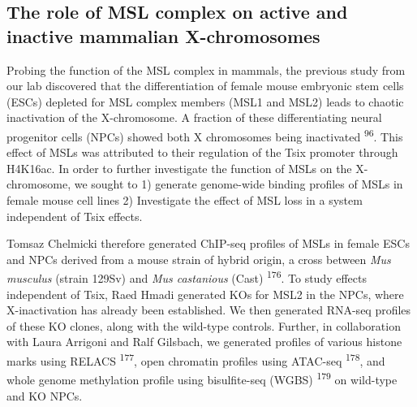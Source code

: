 \documentclass[11pt,twoside]{MPIthesis}
\theoremstyle{definition}
\theoremstyle{definition}
\theoremstyle{definition}
\theoremstyle{remark}
\begin{document}
\subsection{The role of MSL complex on active and inactive mammalian
X-chromosomes}\label{the-role-of-msl-complex-on-active-and-inactive-mammalian-x-chromosomes}

Probing the function of the MSL complex in mammals, the previous study
from our lab discovered that the differentiation of female mouse
embryonic stem cells (ESCs) depleted for MSL complex members (MSL1 and
MSL2) leads to chaotic inactivation of the X-chromosome. A fraction of
these differentiating neural progenitor cells (NPCs) showed both X
chromosomes being inactivated \textsuperscript{96}. This effect of MSLs
was attributed to their regulation of the Tsix promoter through H4K16ac.
In order to further investigate the function of MSLs on the
X-chromosome, we sought to 1) generate genome-wide binding profiles of
MSLs in female mouse cell lines 2) Investigate the effect of MSL loss in
a system independent of Tsix effects.

Tomsaz Chelmicki therefore generated ChIP-seq profiles of MSLs in female
ESCs and NPCs derived from a mouse strain of hybrid origin, a cross
between \emph{Mus musculus} (strain 129Sv) and \emph{Mus castanious}
(Cast) \textsuperscript{176}. To study effects independent of Tsix, Raed
Hmadi generated KOs for MSL2 in the NPCs, where X-inactivation has
already been established. We then generated RNA-seq profiles of these KO
clones, along with the wild-type controls. Further, in collaboration
with Laura Arrigoni and Ralf Gilsbach, we generated profiles of various
histone marks using RELACS \textsuperscript{177}, open chromatin
profiles using ATAC-seq \textsuperscript{178}, and whole genome
methylation profile using bisulfite-seq (WGBS) \textsuperscript{179} on
wild-type and KO NPCs.
\end{document}
